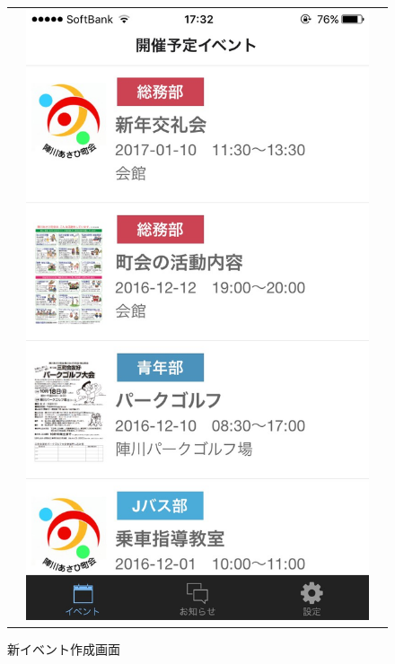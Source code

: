 \begin{figure}[h]
\begin{tabular}{ccc}
\begin{minipage}[t]{0.3\hsize}
        \caption{旧イベントリスト画面}
        \label{beforeventlist}
      \end{minipage} &
      \begin{minipage}[t]{0.3\hsize}
        \centering
        \includegraphics[keepaspectratio, scale=0.1]{picture/ui_update/afterupdate1.jpg}
        \caption{新イベント作成画面}
        \label{aftereventlist}
      \end{minipage}

\end{tabular}
\end{figure}
